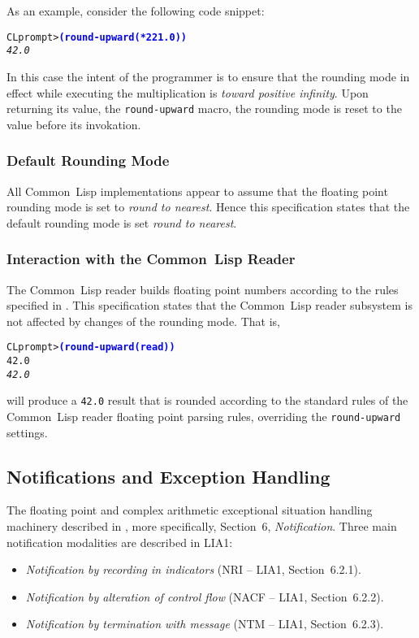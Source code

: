 \documentclass[10pt,fleqn]{article}
\newcommand{\CL}{\textsf{Common~Lisp}}
\newcommand{\code}[1]{\texttt{#1}}
\newcommand{\codeprompt}[1]{\textcolor{blue}{\textbf{#1}}}
\begin{document}
\vspace*{3mm}

\noindent
As an example, consider the following code snippet:
\begin{alltt}
CL prompt> \codeprompt{(round-upward (* 2 21.0))}
\textit{42.0}
\end{alltt}
In this case the intent of the programmer is to ensure that the
rounding mode in effect while executing the multiplication is
\emph{toward positive infinity}.  Upon returning its value, the
\code{round-upward} macro, the rounding mode is reset to the value
before its invokation.

\subsubsection{Default Rounding Mode}

All \CL{} implementations appear to assume that the floating point
rounding mode is set to \emph{round to nearest}.  Hence this
specification states that the default rounding mode is set \emph{round
  to nearest}.

\subsubsection{Interaction with the \CL{} Reader}

The \CL{} reader builds floating point numbers according to the rules
specified in \cite{1994:ANSICL}.  This specification states that the
\CL{} reader subsystem is not affected by changes of the rounding
mode.  That is,
\begin{alltt}
CL prompt> \codeprompt{(round-upward (read))}
42.0
\textit{42.0}
\end{alltt}
will produce a \code{42.0} result that is rounded according to the
standard rules of the \CL{} reader floating point parsing
rules, overriding the \code{round-upward} settings.



\subsection{Notifications and Exception Handling}
\label{sect:notifications}

The floating point and complex arithmetic exceptional situation
handling machinery described in
\cite{2012:LIA1,2001:LIA2,2004:LIA3,2008:IEEE-754}, more specifically,
\cite{2012:LIA1} Section~6, \emph{Notification}.  Three main
notification modalities are described in LIA1:
\begin{itemize}
\item \emph{Notification by recording in indicators} (NRI -- LIA1,
  Section~6.2.1).
\item \emph{Notification by alteration of control flow} (NACF -- LIA1,
  Section~6.2.2).
\item \emph{Notification by termination with message} (NTM -- LIA1,
  Section~6.2.3).
\end{itemize}
\end{document}
